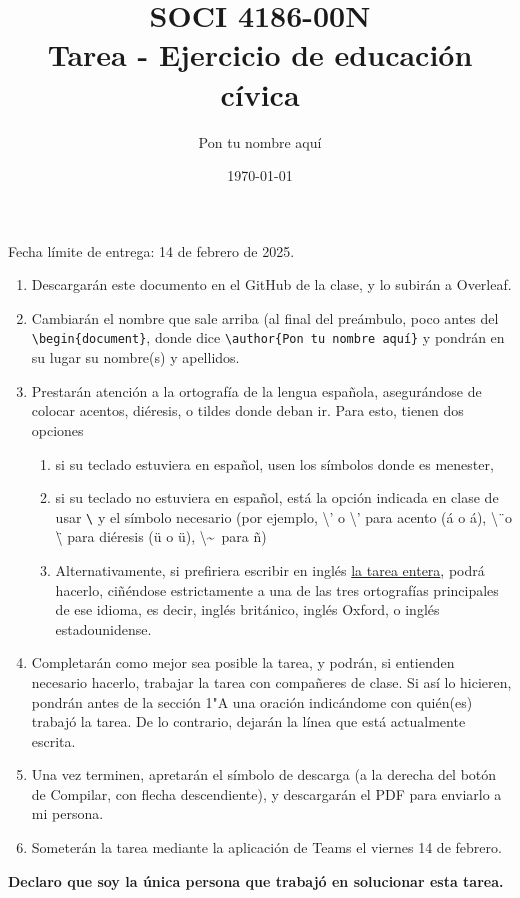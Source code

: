 \documentclass[11pt]{article}
\title{SOCI 4186-00N\\ Tarea \textnumero 2 - Ejercicio de educación cívica}
\author{Pon tu nombre aquí}
\date{\today}
\begin{document}
\singlespacing
\maketitle
\onehalfspacing
Fecha límite de entrega: 14 de febrero de 2025.

\begin{enumerate}
    \item Descargarán este documento en el GitHub de la clase, y lo subirán a Overleaf.
    \item Cambiarán el nombre que sale arriba (al final del preámbulo, poco antes del \texttt{\textbackslash begin\{document\}}, donde dice \texttt{\textbackslash author\{Pon tu nombre aquí\}} y pondrán en su lugar su nombre(s) y apellidos.
    \item Prestarán atención a la ortografía de la lengua española, asegurándose de colocar acentos, diéresis, o tildes donde deban ir. Para esto, tienen dos opciones 
    \begin{enumerate}
        \item si su teclado estuviera en español, usen los símbolos donde es menester,
        \item si su teclado no estuviera en español, está la opción indicada en clase de usar \texttt{\textbackslash} y el símbolo necesario (por ejemplo, \textbackslash' o \textbackslash'{} para acento (\'a o \'{a}), \textbackslash\"\ o \textbackslash\"{} para diéresis (\"u o \"{u}), \textbackslash\textasciitilde\ para \~n)
        \item Alternativamente, si prefiriera escribir en inglés \underline{la tarea entera}, podrá hacerlo, ciñéndose estrictamente a una de las tres ortografías principales de ese idioma, es decir, inglés británico, inglés Oxford, o inglés estadounidense.
    \end{enumerate}
    \item Completarán como mejor sea posible la tarea, y podrán, si entienden necesario hacerlo, trabajar la tarea con compañeres de clase. Si así lo hicieren, pondrán antes de la sección 1"A una oración indicándome con quién(es) trabajó la tarea. De lo contrario, dejarán la línea que está actualmente escrita.
    \item  Una vez terminen, apretarán el símbolo de descarga (a la derecha del botón de Compilar, con flecha descendiente), y descargarán el PDF para enviarlo a mi persona.
    \item Someterán la tarea mediante la aplicación de Teams el viernes 14 de febrero.
\end{enumerate}
\textbf{Declaro que soy la única persona que trabajó en solucionar esta tarea.}
\end{document}
